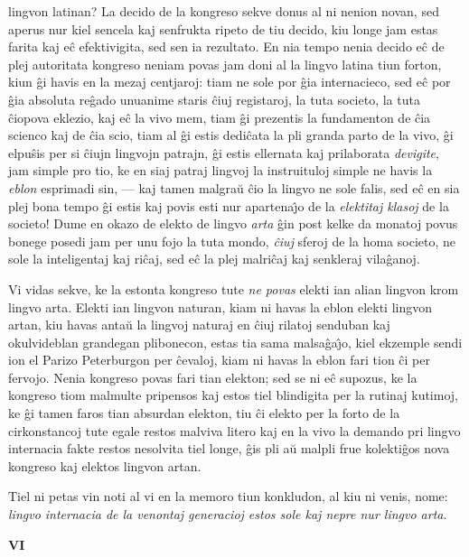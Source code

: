 lingvon latinan? La decido de la kongreso sekve donus al ni nenion
novan, sed aperus nur kiel sencela kaj senfrukta ripeto de tiu
decido, kiu longe jam estas farita kaj e\^c efektivigita, sed sen ia
rezultato. En nia tempo nenia decido e\^c de plej autoritata
kongreso neniam povas jam doni al la lingvo latina tiun forton, kiun
\^gi havis en la mezaj centjaroj: tiam ne sole por \^gia
internacieco, sed e\^c por \^gia absoluta re\^gado unuanime staris
\^ciuj registaroj, la tuta societo, la tuta \^ciopova eklezio, kaj
e\^c la vivo mem, tiam \^gi prezentis la fundamenton de \^cia
scienco kaj de \^cia scio, tiam al \^gi estis dedi\^cata la pli
granda parto de la vivo, \^gi elpu\^sis per si \^ciujn lingvojn
patrajn, \^gi estis ellernata kaj prilaborata {\sl devigite}, jam
simple pro tio, ke en siaj patraj lingvoj la instruituloj simple ne
havis la {\sl eblon} esprimadi sin,
--- kaj tamen malgra\u u \^cio la lingvo ne sole falis, sed e\^c en
sia plej bona tempo \^gi estis kaj povis esti nur apartena\^{\j}o de
la {\sl elektitaj klasoj} de la societo! Dume en okazo de elekto de
lingvo {\sl arta} \^gin post kelke da monatoj povus bonege posedi
jam per unu fojo la tuta mondo, {\sl \^ciuj} sferoj de la homa
societo, ne sole la inteligentaj kaj ri\^caj, sed e\^c la plej
malri\^caj kaj senkleraj vila\^ganoj.

   Vi vidas sekve, ke la estonta kongreso tute {\sl ne povas} elekti ian
alian lingvon krom lingvo arta. Elekti ian lingvon naturan, kiam ni
havas la eblon elekti lingvon artan, kiu havas anta\u u la lingvoj
naturaj en \^ciuj rilatoj senduban kaj okulvideblan grandegan
plibonecon, estas tia sama malsa\^ga\^{\j}o, kiel ekzemple sendi ion
el Parizo Peterburgon per \^cevaloj, kiam ni havas la eblon fari
tion \^ci per fervojo. Nenia kongreso povas fari tian elekton; sed
se ni e\^c supozus, ke la kongreso tiom malmulte pripensos kaj estos
tiel blindigita per la rutinaj kutimoj, ke \^gi tamen faros tian
absurdan elekton, tiu \^ci elekto per la forto de la cirkonstancoj
tute egale restos malviva litero kaj en la vivo la demando pri
lingvo internacia fakte restos nesolvita tiel longe, \^gis pli a\u u
malpli frue kolekti\^gos nova kongreso kaj elektos lingvon artan.

   Tiel ni petas vin noti al vi en la memoro tiun konkludon, al kiu ni
venis, nome: {\sl lingvo internacia de la venontaj generacioj estos
sole kaj nepre nur lingvo arta}.

\newpage

\begin{center}
\textbf{VI}
\end{center}


